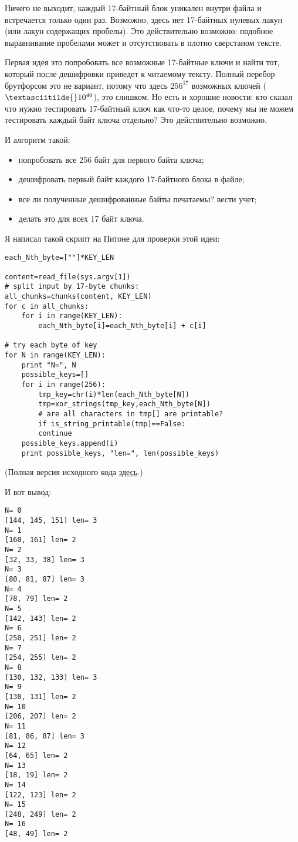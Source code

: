 Ничего не выходит, каждый 17-байтный блок уникален внутри файла и встречается только один раз.
Возможно, здесь нет 17-байтных нулевых лакун (или лакун содержащих пробелы).
Это действительно возможно: подобное выравнивание пробелами может и отсутствовать в плотно сверстаном тексте.

Первая идея это попробовать все возможные 17-байтные ключи и найти тот, который после дешифровки приведет к читаемому тексту.
Полный перебор брутфорсом это не вариант, потому что здесь $256^{17}$ возможных ключей ($\textasciitilde{}10^{40}$),
это слишком.
Но есть и хорошие новости: кто сказал что нужно тестировать 17-байтный ключ как что-то целое, почему мы не можем тестировать
каждый байт ключа отдельно?
Это действительно возможно.

И алгоритм такой:

\begin{itemize}
\item попробовать все 256 байт для первого байта ключа;
\item дешифровать первый байт каждого 17-байтного блока в файле;
\item все ли полученные дешифрованные байты печатаемы? вести учет;
\item делать это для всех 17 байт ключа.
\end{itemize}

Я написал такой скрипт на Питоне для проверки этой идеи:

\begin{lstlisting}[caption=Python script,style=custompy]
each_Nth_byte=[""]*KEY_LEN

content=read_file(sys.argv[1])
# split input by 17-byte chunks:
all_chunks=chunks(content, KEY_LEN)
for c in all_chunks:
    for i in range(KEY_LEN):
        each_Nth_byte[i]=each_Nth_byte[i] + c[i]

# try each byte of key
for N in range(KEY_LEN):
    print "N=", N
    possible_keys=[]
    for i in range(256):
        tmp_key=chr(i)*len(each_Nth_byte[N])
        tmp=xor_strings(tmp_key,each_Nth_byte[N])
        # are all characters in tmp[] are printable?
        if is_string_printable(tmp)==False:
	    continue
	possible_keys.append(i)
    print possible_keys, "len=", len(possible_keys)
\end{lstlisting}

(Полная версия исходного кода \href{\GitHubBlobMasterURL/ff/XOR/mask_2/files/decrypt2.py}{здесь}.)

И вот вывод:

\begin{lstlisting}
N= 0
[144, 145, 151] len= 3
N= 1
[160, 161] len= 2
N= 2
[32, 33, 38] len= 3
N= 3
[80, 81, 87] len= 3
N= 4
[78, 79] len= 2
N= 5
[142, 143] len= 2
N= 6
[250, 251] len= 2
N= 7
[254, 255] len= 2
N= 8
[130, 132, 133] len= 3
N= 9
[130, 131] len= 2
N= 10
[206, 207] len= 2
N= 11
[81, 86, 87] len= 3
N= 12
[64, 65] len= 2
N= 13
[18, 19] len= 2
N= 14
[122, 123] len= 2
N= 15
[248, 249] len= 2
N= 16
[48, 49] len= 2
\end{lstlisting}


